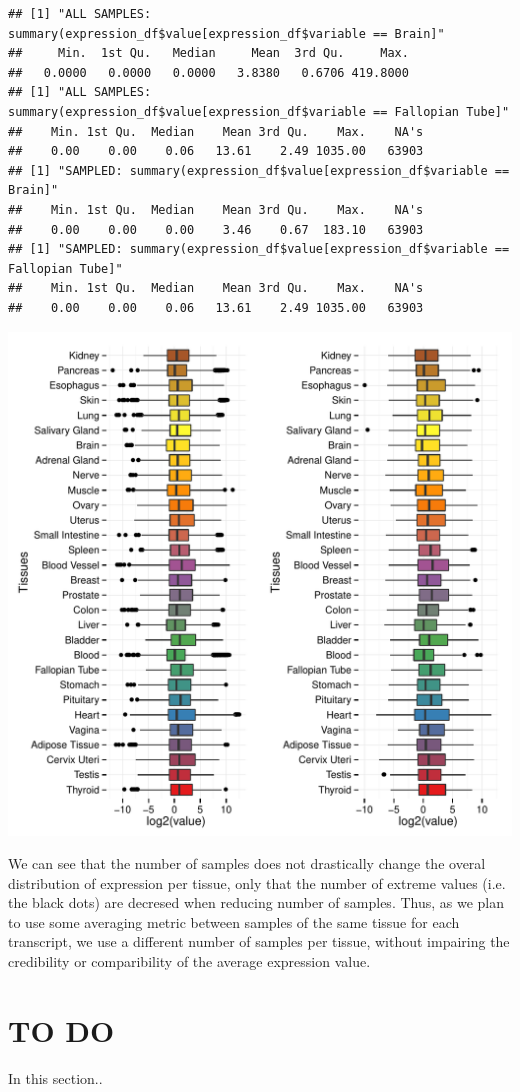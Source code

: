 \documentclass{article}\usepackage[]{graphicx}\usepackage[]{color}
\makeatletter
\def\maxwidth{ %
  \ifdim\Gin@nat@width>\linewidth
    \linewidth
  \else
    \Gin@nat@width
  \fi
}
\newenvironment{kframe}{%
 \def\at@end@of@kframe{}%
 \ifinner\ifhmode%
  \def\at@end@of@kframe{\end{minipage}}%
  \begin{minipage}{\columnwidth}%
 \fi\fi%
 \def\FrameCommand##1{\hskip\@totalleftmargin \hskip-\fboxsep
 \colorbox{shadecolor}{##1}\hskip-\fboxsep
     \hskip-\linewidth \hskip-\@totalleftmargin \hskip\columnwidth}%
 \MakeFramed {\advance\hsize-\width
   \@totalleftmargin\z@ \linewidth\hsize
   \@setminipage}}%
 {\par\unskip\endMakeFramed%
 \at@end@of@kframe}
\newenvironment{knitrout}{}{} %
\makeatother
\begin{document}
\begin{knitrout}
\color{fgcolor}\begin{kframe}
\begin{verbatim}
## [1] "ALL SAMPLES: summary(expression_df$value[expression_df$variable == Brain]"
##     Min.  1st Qu.   Median     Mean  3rd Qu.     Max. 
##   0.0000   0.0000   0.0000   3.8380   0.6706 419.8000 
## [1] "ALL SAMPLES: summary(expression_df$value[expression_df$variable == Fallopian Tube]"
##    Min. 1st Qu.  Median    Mean 3rd Qu.    Max.    NA's 
##    0.00    0.00    0.06   13.61    2.49 1035.00   63903 
## [1] "SAMPLED: summary(expression_df$value[expression_df$variable == Brain]"
##    Min. 1st Qu.  Median    Mean 3rd Qu.    Max.    NA's 
##    0.00    0.00    0.00    3.46    0.67  183.10   63903 
## [1] "SAMPLED: summary(expression_df$value[expression_df$variable == Fallopian Tube]"
##    Min. 1st Qu.  Median    Mean 3rd Qu.    Max.    NA's 
##    0.00    0.00    0.06   13.61    2.49 1035.00   63903
\end{verbatim}
\end{kframe}
\includegraphics[width=\maxwidth]{figure/expression_per_tissue-1} 

\end{knitrout}

We can see that the number of samples does not drastically change the overal distribution of expression per tissue, only that the number of extreme values (i.e. the black dots) are decresed when reducing number of samples. Thus, as we plan to use some averaging metric between samples of the same tissue for each transcript, we use a different number of samples per tissue, without impairing the credibility or comparibility of the average expression value.

\newpage

\section{TO DO}

In this section..
\end{document}
